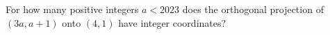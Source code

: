 For how many positive integers $a<2023$ does the orthogonal projection of $(3a,a+1)$ onto $(4,1)$ have integer coordinates?
